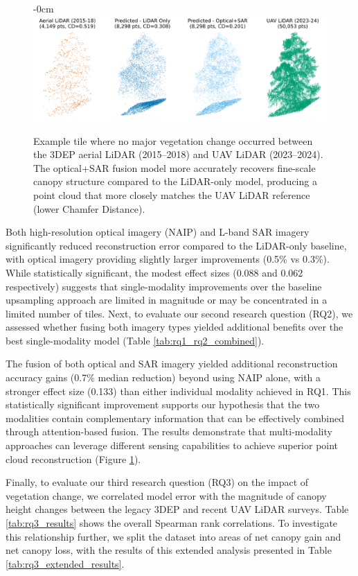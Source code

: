 \documentclass[remotesensing,article,submit,pdftex,moreauthors]{Definitions/mdpi}
\newenvironment{widefigure}[1][]{%
  \begin{figure}[#1]\begin{adjustwidth}{-\extralength}{0cm}\centering}{%
  \end{adjustwidth}\end{figure}}
\begin{document}
\begin{widefigure}
    \vspace{-20pt}
    \centering
    \includegraphics[width=1\linewidth]{manuscript/figures/model_output_example.png}
    \caption{Example tile where no major vegetation change occurred between the 3DEP aerial LiDAR (2015--2018) and UAV LiDAR (2023--2024). The optical+SAR fusion model more accurately recovers fine-scale canopy structure compared to the LiDAR-only model, producing a point cloud that more closely matches the UAV LiDAR reference (lower Chamfer Distance).}
    \label{fig:model_output_example}
\end{widefigure}


Both high-resolution optical imagery (NAIP) and L-band SAR imagery significantly reduced reconstruction error compared to the LiDAR-only baseline, with optical imagery providing slightly larger improvements (0.5\% vs 0.3\%). While statistically significant, the modest effect sizes (0.088 and 0.062 respectively) suggests that single-modality improvements over the baseline upsampling approach are limited in magnitude or may be concentrated in a limited number of tiles. Next, to evaluate our second research question (RQ2), we assessed whether fusing both imagery types yielded additional benefits over the best single-modality model (Table \ref{tab:rq1_rq2_combined}).


The fusion of both optical and SAR imagery yielded additional reconstruction accuracy gains (0.7\% median reduction) beyond using NAIP alone, with a stronger effect size (0.133) than either individual modality achieved in RQ1. This statistically significant improvement supports our hypothesis that the two modalities contain complementary information that can be effectively combined through attention-based fusion. The results demonstrate that multi-modality approaches can leverage different sensing capabilities to achieve superior point cloud reconstruction (Figure \ref{fig:model_output_example}).

Finally, to evaluate our third research question (RQ3) on the impact of vegetation change, we correlated model error with the magnitude of canopy height changes between the legacy 3DEP and recent UAV LiDAR surveys. Table \ref{tab:rq3_results} shows the overall Spearman rank correlations. To investigate this relationship further, we split the dataset into areas of net canopy gain and net canopy loss, with the results of this extended analysis presented in Table \ref{tab:rq3_extended_results}.
\end{document}
